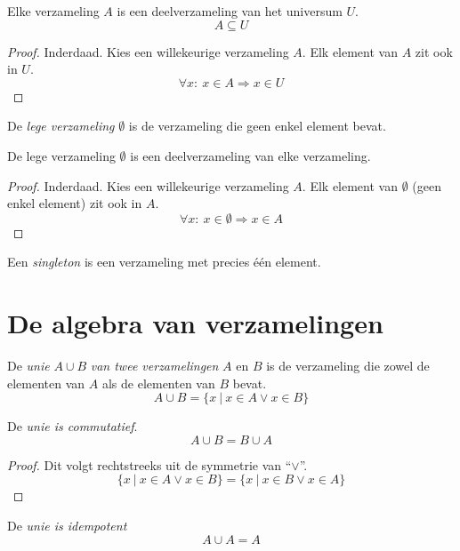 \documentclass[main.tex]{subfiles}
\begin{document}
\begin{st}
  Elke verzameling $A$ is een deelverzameling van het universum $U$.
  \[ A \subseteq U \]
  \begin{proof}
    Inderdaad. Kies een willekeurige verzameling $A$. 
    Elk element van $A$ zit ook in $U$.
    \[
    \forall x:\ x \in A \Rightarrow x \in U
    \]
  \end{proof}
\end{st}

\begin{de}
  De \emph{lege verzameling} $\emptyset$ is de verzameling die geen enkel element bevat.
\end{de}

\begin{st}
  De lege verzameling $\emptyset$ is een deelverzameling van elke verzameling.
  \begin{proof}
    Inderdaad. Kies een willekeurige verzameling $A$.
    Elk element van $\emptyset$ (geen enkel element) zit ook in $A$.
    \[
    \forall x:\ x \in \emptyset \Rightarrow x \in A
    \]
  \end{proof}
\end{st}

\begin{de}
  Een \emph{singleton} is een verzameling met precies \'e\'en element.
\end{de}

\section{De algebra van verzamelingen}
\label{sec:de-algebra-van-verzamelingen}

\begin{de}
  De \emph{unie} $A \cup B$ \emph{van twee verzamelingen} $A$ en $B$ is de verzameling die zowel de elementen van $A$ als de elementen van $B$ bevat.
  \[ A \cup B = \{ x\ |\ x \in A \vee x \in B\} \]
\end{de}

\begin{ei}
  De \emph{unie is commutatief}.
  \[ A \cup B = B \cup A \]
  \begin{proof}
    Dit volgt rechtstreeks uit de symmetrie van ``$\vee$''.
    \[ \{ x\ |\ x \in A \vee x \in B\} = \{ x\ |\ x \in B \vee x \in A\} \]
  \end{proof}
\end{ei}

\begin{ei}
  De \emph{unie is idempotent}
  \[ A \cup A = A \]
\end{ei}
\end{document}
